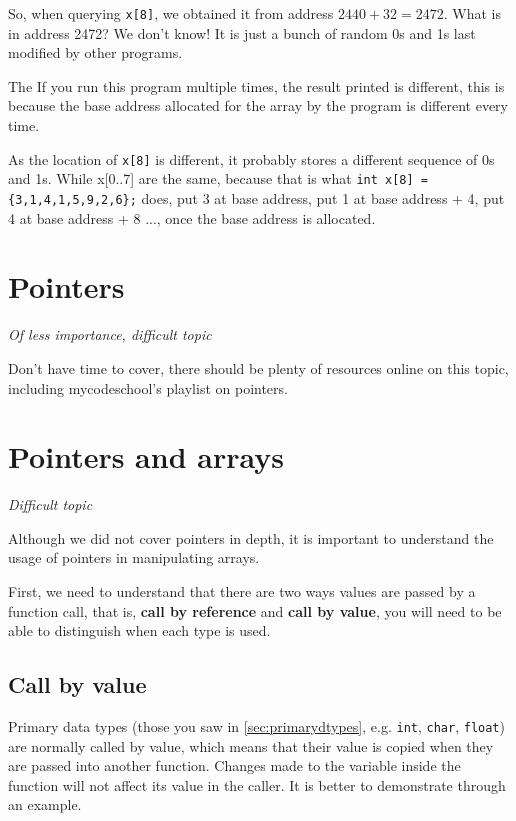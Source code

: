 So, when querying \texttt{x[8]}, we obtained it from address $2440+32 = 2472$. What is in address 2472? We don't know! It is just a bunch of random 0s and 1s last modified by other programs. 


\if{} The \else If you run this program multiple times, the result printed is different, this is because the \fi base address allocated for the array by the program is different every time. 

As the location of \texttt{x[8]} is different, it probably stores a different sequence of 0s and 1s. While x[0..7] are the same, because that is what \texttt{int x[8] = \{3,1,4,1,5,9,2,6\};} does, put 3 at base address, put 1 at base address + 4, put 4 at base address + 8 ..., once the base address is allocated.

\section{Pointers}

\textit{Of less importance, difficult topic}


Don't have time to cover, there should be plenty of resources online on this topic, including mycodeschool's playlist on pointers.

\section{Pointers and arrays}
\label{sec:passbyref}
\textit{Difficult topic}


Although we did not cover pointers in depth, it is important to understand the usage of pointers in manipulating arrays. 

First, we need to understand that there are two ways values are passed by a function call, that is, \textbf{call by reference} and \textbf{call by value}, you will need to be able to distinguish when each type is used.

\subsection{Call by value}

Primary data types (those you saw in \cref{sec:primarydtypes}, e.g. \texttt{int}, \texttt{char}, \texttt{float}) are normally called by value, which means that their value is copied when they are passed into another function. Changes made to the variable inside the function will not affect its value in the caller. It is better to demonstrate through an example.

